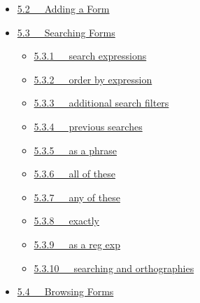 \documentclass[letterpaper,10pt,english]{sphinxmanual}
\begin{document}
{\begin{minipage}{0.95\linewidth}
\begin{itemize}
\begin{itemize}
\begin{itemize}
\item {} 
{\hyperref[documentation:date-and-time-entered]{5.1.20   date and time entered}}

\item {} 
{\hyperref[documentation:date-and-time-last-modified]{5.1.21   date and time last modified}}

\end{itemize}

\item {} 
{\hyperref[documentation:adding-a-form]{5.2   Adding a Form}}

\item {} 
{\hyperref[documentation:searching-forms]{5.3   Searching Forms}}
\begin{itemize}
\item {} 
{\hyperref[documentation:search-expressions]{5.3.1   search expressions}}

\item {} 
{\hyperref[documentation:order-by-expression]{5.3.2   order by expression}}

\item {} 
{\hyperref[documentation:additional-search-filters]{5.3.3   additional search filters}}

\item {} 
{\hyperref[documentation:previous-searches]{5.3.4   previous searches}}

\item {} 
{\hyperref[documentation:as-a-phrase]{5.3.5   as a phrase}}

\item {} 
{\hyperref[documentation:all-of-these]{5.3.6   all of these}}

\item {} 
{\hyperref[documentation:any-of-these]{5.3.7   any of these}}

\item {} 
{\hyperref[documentation:exactly]{5.3.8   exactly}}

\item {} 
{\hyperref[documentation:as-a-reg-exp]{5.3.9   as a reg exp}}

\item {} 
{\hyperref[documentation:searching-and-orthographies]{5.3.10   searching and orthographies}}

\end{itemize}

\item {} 
{\hyperref[documentation:browsing-forms]{5.4   Browsing Forms}}


\end{itemize}
\end{itemize}
\end{minipage}}
\end{document}
